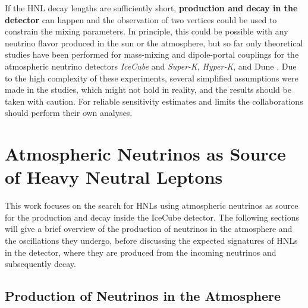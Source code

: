 If the HNL decay lengths are sufficiently short, \textbf{production and decay in the detector} can happen and the observation of two vertices could be used to constrain the mixing parameters. In principle, this could be possible with any neutrino flavor produced in the sun or the atmosphere, but so far only theoretical studies have been performed for mass-mixing and dipole-portal couplings for the atmospheric neutrino detectors \textit{IceCube}  and \textit{Super-K}, \textit{Hyper-K}, and Dune . Due to the high complexity of these experiments, several simplified assumptions were made in the studies, which might not hold in reality, and the results should be taken with caution. For reliable sensitivity estimates and limits the collaborations should perform their own analyses.





\section{Atmospheric Neutrinos as Source of Heavy Neutral Leptons} 

This work focuses on the search for HNLs using atmospheric neutrinos as source for the production and decay inside the IceCube detector. The following sections will give a brief overview of the production of neutrinos in the atmosphere and the oscillations they undergo, before discussing the expected signatures of HNLs in the detector, where they are produced from the incoming neutrinos and subsequently decay.


\subsection{Production of Neutrinos in the Atmosphere}

